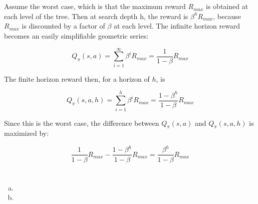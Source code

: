 \documentclass{article}
\begin{document}
\newpage

\section{}

Assume the worst case, which is that the maximum reward $R_{max}$ is obtained
at each level of the tree. Then at search depth h, the reward is
$\beta^h R_{max}$, because $R_{max}$ is discounted by a factor of $\beta$ at
each level. The infinite horizon reward becomes an easily simplifiable
geometric series:

\[
Q_\pi(s,a) = \sum_{i = 1}^{\infty} \beta^i R_{max} =
\frac{1}{1-\beta}R_{max}
\]

The finite horizon reward then, for a horizon of $h$, is

\[
Q_\pi(s,a,h) = \sum_{i = 1}^{h} \beta^i R_{max} = 
\frac{1-\beta^h}{1-\beta}R_{max}
\]

Since this is the worst case, the difference between $Q_\pi(s,a)$ and
$Q_\pi(s,a,h)$ is maximized by:

\[
\frac{1}{1-\beta}R_{max} - \frac{1-\beta^h}{1-\beta}R_{max} =
\frac{\beta^h}{1-\beta}R_{max}
\]

\newpage

\section{}
\begin{enumerate}[(a)]
\item


\item

\end{enumerate}

\newpage

\section{}
\end{document}
